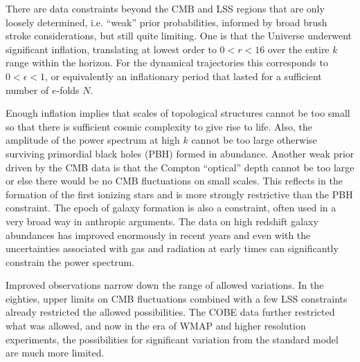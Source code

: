 \documentclass[a4paper,11pt]{article}
\begin{document}
There are data constraints beyond the CMB and LSS regions that are
only loosely determined, i.e. ``weak'' prior probabilities, informed
by broad brush stroke considerations, but still quite limiting. One is
that the Universe underwent significant inflation, translating at
lowest order to $0 < r < 16$ over the entire $k$ range within the
horizon. For the dynamical trajectories this corresponds to $0<
\epsilon < 1$, or equivalently an inflationary period that lasted for
a sufficient number of $e$-folds $N$.

Enough inflation implies that scales of topological structures cannot
be too small so that there is sufficient cosmic complexity to give
rise to life. Also, the amplitude of the power spectrum at high $k$
cannot be too large otherwise surviving primordial black holes (PBH)
formed in abundance. Another weak prior driven by the CMB data is that
the Compton ``optical'' depth cannot be too large or else there would
be no CMB fluctuations on small scales. This reflects in the formation
of the first ionizing stars and is more strongly restrictive than the
PBH constraint. The epoch of galaxy formation is also a constraint,
often used in a very broad way in anthropic arguments. The data on
high redshift galaxy abundances has improved enormously in recent
years and even with the uncertainties associated with gas and
radiation at early times can significantly constrain the power
spectrum. 

Improved observations narrow down the range of allowed variations. In
the eighties, upper limits on CMB fluctuations combined with a few LSS
constraints already restricted the allowed possibilities. The COBE
data further restricted what was allowed, and now in the era of WMAP
and higher resolution experiments, the possibilities for significant
variation from the standard model are much more limited.
\end{document}
